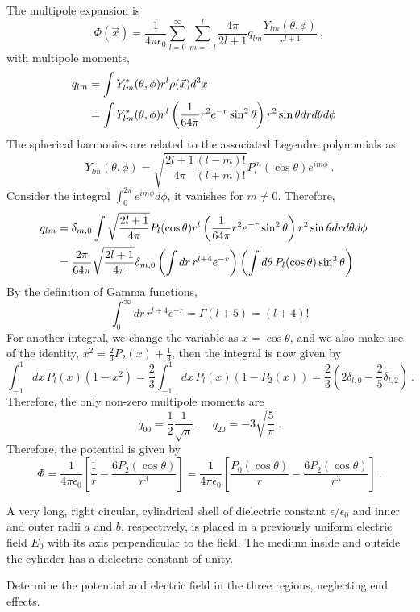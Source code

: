\documentclass[12pt]{article}
\begin{document}
\newpage
{} The multipole expansion is
\begin{equation}
    \Phi(\vec x) = \frac{1}{4\pi \epsilon_0} \sum_{l = 0}^\infty \sum_{m = -l}^l \frac{4\pi}{2l+1} q_{lm} \frac{Y_{lm}(\theta, \phi)}{r^{l+1}}~,
\end{equation}
with multipole moments,
\begin{align}
    q_{lm} &= \int Y^*_{lm}(\theta, \phi) r^l \rho(\vec x) d^3 x\cr
    &=\int Y_{lm}^*(\theta, \phi) r^l \left(\frac{1}{64\pi} r^2 e^{-r} \sin^2 \theta\right) r^2 \sin\theta dr d\theta d\phi
\end{align}
The spherical harmonics are related to the associated Legendre polynomials as
\begin{equation}
    Y_{lm}(\theta, \phi) = \sqrt{\frac{2l+1}{4\pi} \frac{(l-m)!}{(l+m)!}} P_l^m(\cos \theta) e^{im\phi}~.
\end{equation}
Consider the integral $\int_0^{2\pi} e^{im\phi} d\phi$, it vanishes for $m \neq 0$. Therefore,
\begin{align}
    q_{lm} &= \delta_{m,0} \int \sqrt{\frac{2l+1}{4\pi}} P_l(\cos\theta)r^l \left(\frac{1}{64\pi} r^2 e^{-r} \sin^2 \theta\right) r^2 \sin\theta dr d\theta d\phi \cr
    &= \frac{2\pi}{64\pi}\sqrt{\frac{2l+1}{4\pi}} \delta_{m,0} \left(\int dr\, r^{l+4} e^{-r} \right) \left(\int d\theta\, P_l(\cos \theta) \sin^3\theta\right)
\end{align}
By the definition of Gamma functions,
\begin{equation}
    \boxed{
    \int_0^\infty dr\, r^{l+4} e^{-r} = \Gamma(l+5) = (l+4)!
    }
\end{equation}
For another integral, we change the variable as $x = \cos \theta$, and we also make use of the identity, $x^2 = \frac{2}{3} P_2(x) + \frac{1}{3}$, then the integral is now given by
\begin{equation}
    \boxed{
    \int_{-1}^1 dx\, P_l(x)(1-x^2) = \frac{2}{3}\int_{-1}^1 dx\, P_l(x) (1 - P_2(x)) = \frac{2}{3} \left(2 \delta_{l,0} - \frac{2}{5} \delta_{l,2}\right)~.
    }
\end{equation}
Therefore, the only non-zero multipole moments are
\begin{equation}
    \boxed{
    q_{00} = \frac{1}{2} \frac{1}{\sqrt{\pi}}~, \quad  q_{20} = -3\sqrt{\frac{5}{\pi}}~.
    }
\end{equation}
Therefore, the potential is given by
\begin{equation}
    \boxed{
    \Phi = \frac{1}{4\pi \epsilon_0} \left[\frac{1}{r} - \frac{6 P_2(\cos \theta)}{r^3}\right] = \frac{1}{4\pi \epsilon_0} \left[\frac{P_0(\cos\theta)}{r} - \frac{6 P_2(\cos \theta)}{r^3}\right]~.
    }
\end{equation}

\newpage
{} A very long, right circular, cylindrical shell of dielectric constant $\epsilon/\epsilon_0$ and inner and outer radii $a$ and $b$, respectively, is placed in a previously uniform electric field $E_0$ with its axis perpendicular to the field. The medium inside and outside the cylinder has a dielectric constant of unity.

 Determine the potential and electric field in the three regions, neglecting end effects.
\end{document}
